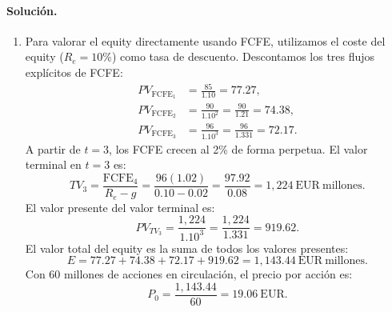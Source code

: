 \documentclass[12pt,a4paper]{article}
\newcommand{\EUR}[1]{\ensuremath{#1~\text{EUR}}}
\newenvironment{solucion}{\paragraph{Solución.}}{}
\begin{document}
\begin{solucion}
\begin{enumerate}[label=\alph*)]
  \item Para valorar el equity directamente usando FCFE, utilizamos el coste del equity ($R_e=10\%$) como tasa de descuento. Descontamos los tres flujos explícitos de FCFE:
  \begin{align*}
  PV_{\text{FCFE}_1} &= \frac{85}{1.10} = 77.27,\\
  PV_{\text{FCFE}_2} &= \frac{90}{1.10^2} = \frac{90}{1.21} = 74.38,\\
  PV_{\text{FCFE}_3} &= \frac{96}{1.10^3} = \frac{96}{1.331} = 72.17.
  \end{align*}
  A partir de $t=3$, los FCFE crecen al 2\% de forma perpetua. El valor terminal en $t=3$ es:
  \[
  TV_3 = \frac{\text{FCFE}_4}{R_e - g} = \frac{96(1.02)}{0.10-0.02} = \frac{97.92}{0.08} = \EUR{1{,}224}~\text{millones}.
  \]
  El valor presente del valor terminal es:
  \[
  PV_{TV_3} = \frac{1{,}224}{1.10^3} = \frac{1{,}224}{1.331} = 919.62.
  \]
  El valor total del equity es la suma de todos los valores presentes:
  \[
  E = 77.27 + 74.38 + 72.17 + 919.62 = \EUR{1{,}143.44}~\text{millones}.
  \]
  Con 60 millones de acciones en circulación, el precio por acción es:
  \[
  P_0 = \frac{1{,}143.44}{60} = \EUR{19.06}.
  \]

\end{enumerate}
\end{solucion}
\end{document}
